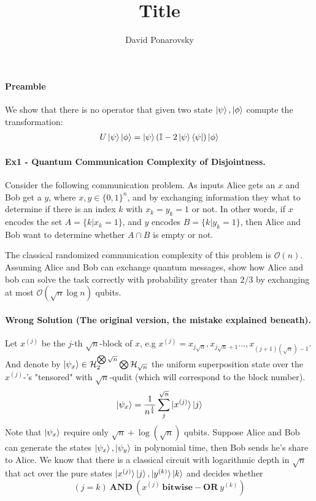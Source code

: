 \documentclass{article}
\newcommand{\onotation}[1]{\(\mathcal{O} \left( {#1}  \right) \)}
\newcommand{\ona}[1]{\onotation{#1}}
\begin{document}
\title{Title}
\author{David Ponarovsky}
\maketitle
\begin{multicols*}{2}

\paragraph{Preamble} We show that there is no operator that given two state $\ket{\psi},\ket{\phi}$ comupte the transformation: 
\begin{equation*}
  \begin{split}
    U \ket{\psi}\ket{\phi} = \ket{\psi}\left( \mathbb{I} - 2 \ket{\psi}\bra{\psi} \right)\ket{\phi} 
   \end{split}
\end{equation*}


\paragraph{Ex1 - Quantum Communication Complexity of Disjointness.}
Consider the following communication
problem. As inputs Alice gets an \(x\) and Bob get a \(y\), where \(x, y \in \{0, 1\}^n \), and by exchanging information they what to determine if there is an index \(k\) with \(x_k = y_k = 1 \) or not. 
In other words, if \(x\) encodes the
set \(A = \{k | x_k = 1\} \), and \(y\) encodes \(B = \{k | y_k = 1\}\), then Alice and Bob want to determine whether \( A \cap B \) is empty or not.

The classical randomized communication complexity of this problem is \ona{n}.
Assuming Alice and Bob can exchange quantum messages, show how Alice and bob can solve the task
correctly with probability greater than \(2/3\) by exchanging at most \ona{\sqrt{n}\log n } qubits.


\paragraph{Wrong Solution (The original version, the mistake explained beneath).}
Let \( x^{(j)} \) be the \(j\)-th \(\sqrt{n}\)-block of \(x\), e.g \(x^{(j)} = x_{j\sqrt{n}},x_{j\sqrt{n}+1}...,x_{(j+1)(\sqrt{n})-1}  \). And denote by \( \ket{\psi_x} \in \mathcal{H}_{2}^{\bigotimes \sqrt{n}} \bigotimes \mathcal{H}_{\sqrt{n}} \) the uniform superposition state over the \( x^{(j)}\)-'s "tensored" with \(\sqrt{n}\)-qudit (which will correspond to the block number).  \[ \ket{\psi_x} = \frac{1}{n^\frac{1}{4}}\sum_{j}^{\sqrt{n}}\ket{x^{(j)}}\ket{j} \] Note that \( \ket{\psi_x} \) require only \( \sqrt{n} + \log(\sqrt{n}) \) qubits. Suppose Alice and Bob can generate the states \( \ket{\psi_x}, \ket{\psi_y} \) in polynomial time, then Bob sends he's share to Alice. We know that there is a classical circuit with logarithmic depth in \( \sqrt{n} \) that act over the pure states \( \ket{x^{(j)}}\ket{j} , \ket{y^{(k)}}\ket{k} \) and decides whether \[ \left( j =  k \right) \ \mathbf{AND}  \ \left( x^{(j)} \ \mathbf{bitwise-OR} \  y^{(k)} \right)   \]


\end{multicols*}
\end{document}
